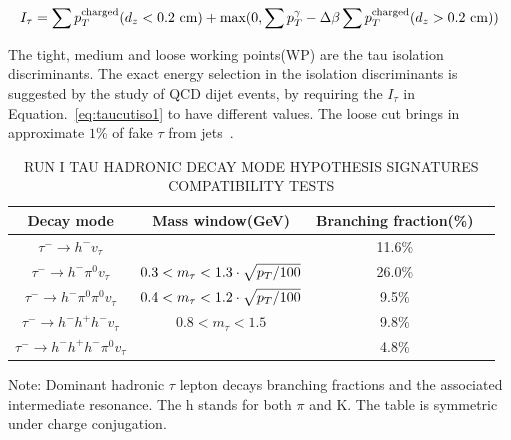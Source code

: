 \begin{align}
I_{\tau}=\sum \pt^{\text{charged}} (d_{z}<0.2 \ \text{cm})+\text{max}(0,\sum \pt^{\gamma}-\Delta \beta \sum \pt^{\text{charged}} (d_{z}>0.2 \ \text{cm}))\label{eq:taucutiso1}
\end{align}

The tight, medium and loose working points(WP) are the tau isolation discriminants. The exact energy selection in the isolation discriminants is suggested by the study of QCD dijet events, by requiring the $I_{\tau}$ in Equation.~\ref{eq:taucutiso1} to have different values. The loose cut brings in approximate $1\%$ of fake $\tau$ from jets~\cite{TauIdentiRunI}. 


\begin{table}[htp]
\begin{threeparttable}
\caption{RUN I TAU HADRONIC DECAY MODE HYPOTHESIS SIGNATURES COMPATIBILITY TESTS}\label{tb:tauHdecay}
\begin{center}
\begin{tabular}{|c|c|c|c|}
\hline
Decay mode                                             & Mass window(GeV)                                & Branching fraction(\%)\\\hline
$\tau^{-}\to h^{-}v_{\tau}$                         &                                                                 &  11.6\%     \\
$\tau^{-}\to h^{-}\pi^{0} v_{\tau}$              & $0.3<m_{\tau}<1.3\cdot \sqrt{p_{T}/100}$    &   26.0\%      \\
$\tau^{-}\to h^{-}\pi^{0} \pi^{0}  v_{\tau}$  &  $0.4<m_{\tau}<1.2\cdot \sqrt{p_{T}/100}$      &   9.5\%     \\
$\tau^{-}\to h^{-}h^{+}h^{-}v_{\tau}$         & $0.8<m_{\tau}<1.5$                                        &   9.8\%  \\
$\tau^{-}\to h^{-}h^{+}h^{-}\pi^{0} v_{\tau}$      &                             &   4.8\% \\\hline
 \end{tabular}
 \begin{tablenotes}
 \small
 \item Note: Dominant hadronic $\tau$ lepton decays branching fractions and the associated intermediate resonance. The h stands for both $\pi$ and K. The table is symmetric under charge conjugation.
 \end{tablenotes}
\end{center}
\end{threeparttable}
\end{table}


